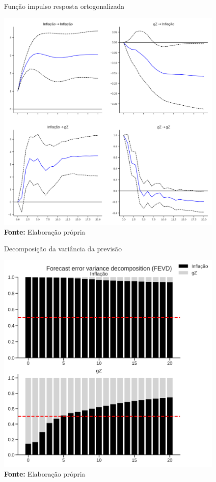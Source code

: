 \begin{figure}[htb]
	\centering
	\caption{Função impulso resposta ortogonalizada}
	\label{fevd}
	\includegraphics[width=\textwidth]{../../Modelo/SeriesTemporais/figs/Impulso_VECM_Infla.png}
	\caption*{\textbf{Fonte:} Elaboração própria}
\end{figure}


\begin{figure}[htb]
	\centering
	\caption{Decomposição da variância da previsão}
	\label{fevd}
	\includegraphics[width = \textwidth]{../../Modelo/SeriesTemporais/figs/FEVD_VECMpython_Infla.png}
	\caption*{\textbf{Fonte:} Elaboração própria}
\end{figure}

